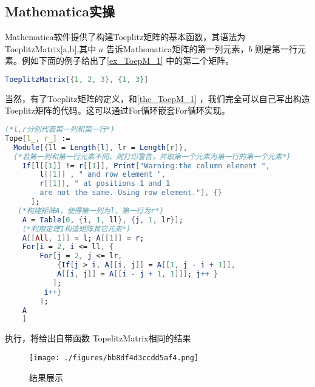 \subsection{Mathematica实操}
Mathematica软件提供了构建Toeplitz矩阵的基本函数，其语法为 ToeplitzMatrix[a,b],其中 $a$ 告诉Mathematica矩阵的第一列元素，$b$ 则是第一行元素。例如下面的例子给出了\autoref{ex_ToepM_1} 中的第二个矩阵。
\begin{lstlisting}[language=mathematica, caption=Mathematica构造Toeplitz矩阵]
ToeplitzMatrix[{1, 2, 3}, {1, 3}]
\end{lstlisting}
当然，有了Toeplitz矩阵的定义，和\autoref{the_ToepM_1} ，我们完全可以自己写出构造Toeplitz矩阵的代码。这可以通过For循环嵌套For循环实现。
\begin{lstlisting}[language=mathematica, caption=Mathematica自写Toeplitz矩阵代码]
(*l,r分别代表第一列和第一行*)
Tope[l_, r_] := 
  Module[{ll = Length[l], lr = Length[r]},
  (*若第一列和第一行元素不同，则打印警告，并取第一个元素为第一行的第一个元素*)
    If[l[[1]] != r[[1]], Print["Warning:the column element ",
        l[[1]] , " and row element ", 
        r[[1]], " at positions 1 and 1
        are not the same. Using row element."], {}
      ];
   (*构建矩阵A，使得第一列为l，第一行为r*)
    A = Table[0, {i, 1, ll}, {j, 1, lr}];
    (*利用定理1构造矩阵其它元素*)
    A[[All, 1]] = l; A[[1]] = r;
    For[i = 2, i <= ll, {
        For[j = 2, j <= lr,
            {If[j > i, A[[i, j]] = A[[1, j - i + 1]], 
            A[[i, j]] = A[[i - j + 1, 1]]]; j++ } 
           ];
         i++}
        ];
    A
    ]
\end{lstlisting}
执行，将给出自带函数 TopelitzMatrix相同的结果
\begin{figure}[ht]
\centering
\texttt{[image: ./figures/bb8df4d3ccdd5af4.png]}
\caption{结果展示} \label{fig_ToepM_1}
\end{figure}

